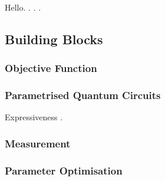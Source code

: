 
Hello. \cite{bharti2021noisy}. . .


\subsection{Building Blocks}

\subsubsection{Objective Function}

\subsubsection{Parametrised Quantum Circuits}
Expressiveness \cite{larocca2021theory}.

\subsubsection{Measurement}

\subsubsection{Parameter Optimisation}